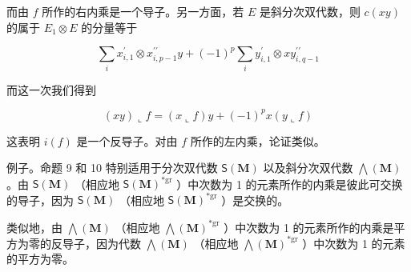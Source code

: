 而由 \(f\) 所作的右内乘是一个导子。另一方面，若 \(E\) 是斜分次双代数，则 \(c(xy)\) 的属于 \(E_1 \otimes E\) 的分量等于

\[
\sum_ {i} x _ {i, 1} ^ {\prime} \otimes x _ {i, p - 1} ^ {\prime \prime} y + (- 1) ^ {p} \sum_ {i} y _ {i, 1} ^ {\prime} \otimes x y _ {i, q - 1} ^ {\prime \prime}
\]

而这一次我们得到

\[
(x y) \llcorner f = (x \llcorner f) y + (- 1) ^ {p} x (y \llcorner f)
\]

这表明 \(i(f)\) 是一个反导子。对由 \(f\) 所作的左内乘，论证类似。

例子。命题 9 和 10 特别适用于分次双代数 \(\mathsf{S}(\mathbf{M})\) 以及斜分次双代数 \(\bigwedge (\mathbf{M})\) 。由 \(\mathsf{S}(\mathbf{M})\) （相应地 \(\mathsf{S}(\mathbf{M})^{*\mathrm{gr}}\) ）中次数为 1 的元素所作的内乘是彼此可交换的导子，因为 \(\mathsf{S}(\mathbf{M})\) （相应地 \(\mathsf{S}(\mathbf{M})^{*\mathrm{gr}}\) ）是交换的。

类似地，由 \(\bigwedge (\mathbf{M})\) （相应地 \(\bigwedge (\mathbf{M})^{*\mathrm{gr}}\) ）中次数为 1 的元素所作的内乘是平方为零的反导子，因为代数 \(\bigwedge (\mathbf{M})\) （相应地 \(\bigwedge (\mathbf{M})^{*\mathrm{gr}}\) ）中次数为 1 的元素的平方为零。

